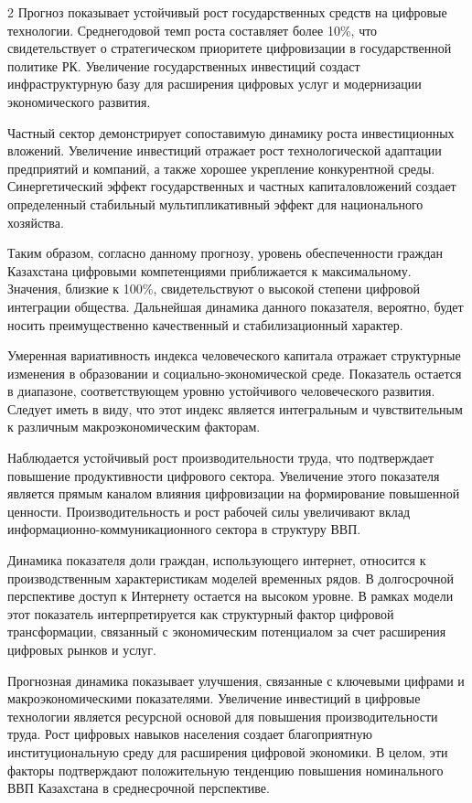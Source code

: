 \begin{multicols}{2}
Прогноз показывает устойчивый рост государственных средств на цифровые
технологии. Среднегодовой темп роста составляет более 10\%, что
свидетельствует о стратегическом приоритете цифровизации в
государственной политике РК. Увеличение государственных инвестиций
создаст инфраструктурную базу для расширения цифровых услуг и
модернизации экономического развития.

Частный сектор демонстрирует сопоставимую динамику роста инвестиционных
вложений. Увеличение инвестиций отражает рост технологической адаптации
предприятий и компаний, а также хорошее укрепление конкурентной среды.
Синергетический эффект государственных и частных капиталовложений
создает определенный стабильный мультипликативный эффект для
национального хозяйства.

Таким образом, согласно данному прогнозу, уровень обеспеченности граждан
Казахстана цифровыми компетенциями приближается к максимальному.
Значения, близкие к 100\%, свидетельствуют о высокой степени цифровой
интеграции общества. Дальнейшая динамика данного показателя, вероятно,
будет носить преимущественно качественный и стабилизационный характер.

Умеренная вариативность индекса человеческого капитала отражает
структурные изменения в образовании и социально-экономической среде.
Показатель остается в диапазоне, соответствующем уровню устойчивого
человеческого развития. Следует иметь в виду, что этот индекс является
интегральным и чувствительным к различным макроэкономическим факторам.

Наблюдается устойчивый рост производительности труда, что подтверждает
повышение продуктивности цифрового сектора. Увеличение этого показателя
является прямым каналом влияния цифровизации на формирование повышенной
ценности. Производительность и рост рабочей силы увеличивают вклад
информационно-коммуникационного сектора в структуру ВВП.

Динамика показателя доли граждан, использующего интернет, относится к
производственным характеристикам моделей временных рядов. В долгосрочной
перспективе доступ к Интернету остается на высоком уровне. В рамках
модели этот показатель интерпретируется как структурный фактор цифровой
трансформации, связанный с экономическим потенциалом за счет расширения
цифровых рынков и услуг.

Прогнозная динамика показывает улучшения, связанные с ключевыми цифрами
и макроэкономическими показателями. Увеличение инвестиций в цифровые
технологии является ресурсной основой для повышения производительности
труда. Рост цифровых навыков населения создает благоприятную
институциональную среду для расширения цифровой экономики. В целом, эти
факторы подтверждают положительную тенденцию повышения номинального ВВП
Казахстана в среднесрочной перспективе.


\end{multicols}
